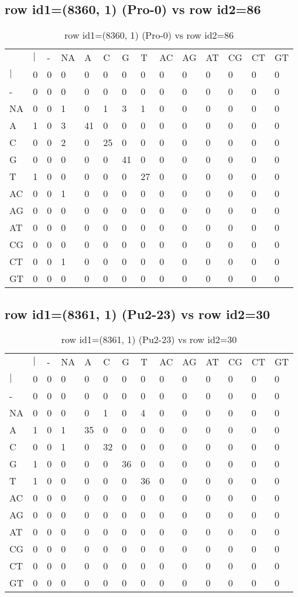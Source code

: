 \subsection{row id1=(8360, 1) (Pro-0) vs row id2=86}
\begin{center}
\begin{longtable}{|l|l|l|l|l|l|l|l|l|l|l|l|l|l|}
\caption{row id1=(8360, 1) (Pro-0) vs row id2=86} \label{table_dm580}\\
\hline
\\
\hline
&$|$&-&NA&A&C&G&T&AC&AG&AT&CG&CT&GT\\
$|$&0&0&0&0&0&0&0&0&0&0&0&0&0\\
-&0&0&0&0&0&0&0&0&0&0&0&0&0\\
NA&0&0&1&0&1&3&1&0&0&0&0&0&0\\
A&1&0&3&41&0&0&0&0&0&0&0&0&0\\
C&0&0&2&0&25&0&0&0&0&0&0&0&0\\
G&0&0&0&0&0&41&0&0&0&0&0&0&0\\
T&1&0&0&0&0&0&27&0&0&0&0&0&0\\
AC&0&0&1&0&0&0&0&0&0&0&0&0&0\\
AG&0&0&0&0&0&0&0&0&0&0&0&0&0\\
AT&0&0&0&0&0&0&0&0&0&0&0&0&0\\
CG&0&0&0&0&0&0&0&0&0&0&0&0&0\\
CT&0&0&1&0&0&0&0&0&0&0&0&0&0\\
GT&0&0&0&0&0&0&0&0&0&0&0&0&0\\
\hline
\end{longtable}
\end{center}

\subsection{row id1=(8361, 1) (Pu2-23) vs row id2=30}
\begin{center}
\begin{longtable}{|l|l|l|l|l|l|l|l|l|l|l|l|l|l|}
\caption{row id1=(8361, 1) (Pu2-23) vs row id2=30} \label{table_dm582}\\
\hline
\\
\hline
&$|$&-&NA&A&C&G&T&AC&AG&AT&CG&CT&GT\\
$|$&0&0&0&0&0&0&0&0&0&0&0&0&0\\
-&0&0&0&0&0&0&0&0&0&0&0&0&0\\
NA&0&0&0&0&1&0&4&0&0&0&0&0&0\\
A&1&0&1&35&0&0&0&0&0&0&0&0&0\\
C&0&0&1&0&32&0&0&0&0&0&0&0&0\\
G&1&0&0&0&0&36&0&0&0&0&0&0&0\\
T&1&0&0&0&0&0&36&0&0&0&0&0&0\\
AC&0&0&0&0&0&0&0&0&0&0&0&0&0\\
AG&0&0&0&0&0&0&0&0&0&0&0&0&0\\
AT&0&0&0&0&0&0&0&0&0&0&0&0&0\\
CG&0&0&0&0&0&0&0&0&0&0&0&0&0\\
CT&0&0&0&0&0&0&0&0&0&0&0&0&0\\
GT&0&0&0&0&0&0&0&0&0&0&0&0&0\\
\hline
\end{longtable}
\end{center}

